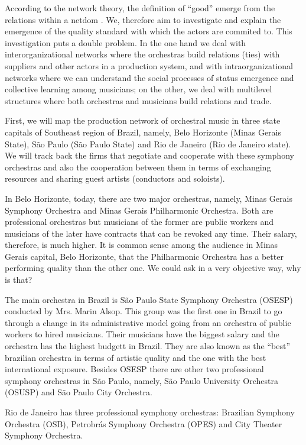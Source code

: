 \documentclass[a4paper, 12pt, openright, oneside, german, french, brazil, english, article]{abntex2}
\begin{document}
	According to the network theory, the definition of ``good'' emerge from the relations within a netdom \cite{white2008}. We, therefore aim to investigate and explain the emergence of the quality standard with which the actors are commited to. This investigation puts a double problem. In the one hand we deal with interorganizational networks where the orchestras build relations (ties) with suppliers and other actors in a production system, and with intraorganizational networks where we can understand the social processes of status emergence and collective learning among musicians; on the other, we deal with multilevel structures where both orchestras and musicians build relations and trade.
	
	First, we will map the production network of orchestral music in three state capitals of Southeast region of Brazil, namely, Belo Horizonte (Minas Gerais State), São Paulo (São Paulo State) and Rio de Janeiro (Rio de Janeiro state). We will track back the firms that negotiate and cooperate with these symphony orchestras and also the cooperation between them in terms of exchanging resources and sharing guest artists (conductors and soloists).
	
	In Belo Horizonte, today, there are two major orchestras, namely, Minas Gerais Symphony Orchestra and Minas Gerais Philharmonic Orchestra. Both are professional orchestras but musicians of the former are public workers and musicians of the later have contracts that can be revoked any time. Their salary, therefore, is much higher. It is common sense among the audience in Minas Gerais capital, Belo Horizonte, that the Philharmonic Orchestra has a better performing quality than the other one. We could ask in a very objective way, why is that?
	
	The main orchestra in Brazil is São Paulo State Symphony Orchestra (OSESP) conducted by Mrs. Marin Alsop. This group was the first one in Brazil to go through a change in its administrative model going from an orchestra of public workers to hired musicians. Their musicians have the biggest salary and the orchestra has the highest budgett in Brazil. They are also known as the ``best'' brazilian orchestra in terms of artistic quality and the one with the best international exposure. Besides OSESP there are other two professional symphony orchestras in São Paulo, namely, São Paulo University Orchestra (OSUSP) and São Paulo City Orchestra.
	
	Rio de Janeiro has three professional symphony orchestras: Brazilian Symphony Orchestra (OSB), Petrobrás Symphony Orchestra (OPES) and City Theater Symphony Orchestra.
	
\end{document}
